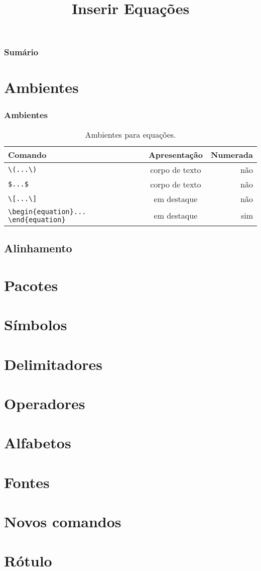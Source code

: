 \documentclass[brazilian]{beamer}
\title{Inserir Equações}
\begin{document}
    \frame{\titlepage}
    
    \begin{frame}
        \frametitle{Sumário}
        \tableofcontents
    \end{frame}

\section{Ambientes}
\begin{frame}[fragile]
    \frametitle{Ambientes}

    \begin{table}
        \caption{Ambientes para equações.}
        \label{tab:Ambientes}
        \begin{tabular}{p{4.5cm}cr}
            Comando & Apresentação & Numerada \\ \hline
            \lstinline[style=myStyleLatex]!\(...\)! & corpo de texto & não \\ \hline
            \lstinline[style=myStyleLatex]!$...$! & corpo de texto & não \\ \hline
            \lstinline[style=myStyleLatex]!\[...\]! & em destaque & não \\ \hline
            \lstinline[style=myStyleLatex]!\begin{equation}... \end{equation}! & em destaque & sim \\ \hline
        \end{tabular}
    \end{table}

\end{frame}
\subsection{Alinhamento}
\section{Pacotes}
\section{Símbolos}
\section{Delimitadores}
\section{Operadores}
\section{Alfabetos}
\section{Fontes}
\section{Novos comandos}
\section{Rótulo}
\end{document}
